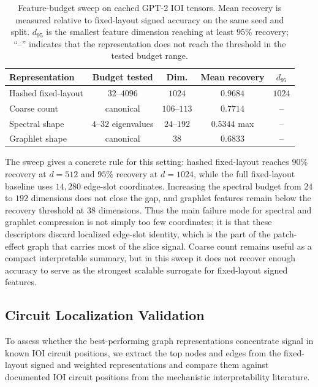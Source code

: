 \documentclass[11pt,a4paper]{article}
\begin{document}
\begin{table}[H]
\centering
\small
\begin{tabular}{lcccc}
\toprule
\textbf{Representation} & \textbf{Budget tested} & \textbf{Dim.} & \textbf{Mean recovery} & \textbf{$d_{95}$} \\
\midrule
Hashed fixed-layout & $32$--$4096$ & $1024$ & $0.9684$ & $1024$ \\
Coarse count & canonical & $106$--$113$ & $0.7714$ & -- \\
Spectral shape & $4$--$32$ eigenvalues & $24$--$192$ & $0.5344$ max & -- \\
Graphlet shape & canonical & $38$ & $0.6833$ & -- \\
\bottomrule
\end{tabular}
\caption{Feature-budget sweep on cached GPT-2 IOI tensors. Mean recovery is measured relative to fixed-layout signed accuracy on the same seed and split. $d_{95}$ is the smallest feature dimension reaching at least $95\%$ recovery; ``--'' indicates that the representation does not reach the threshold in the tested budget range.}
\label{tab:feature_budget_sweep}
\end{table}

The sweep gives a concrete rule for this setting: hashed fixed-layout reaches $90\%$ recovery at $d=512$ and $95\%$ recovery at $d=1024$, while the full fixed-layout baseline uses $14,\!280$ edge-slot coordinates. Increasing the spectral budget from $24$ to $192$ dimensions does not close the gap, and graphlet features remain below the recovery threshold at $38$ dimensions. Thus the main failure mode for spectral and graphlet compression is not simply too few coordinates; it is that these descriptors discard localized edge-slot identity, which is the part of the patch-effect graph that carries most of the slice signal. Coarse count remains useful as a compact interpretable summary, but in this sweep it does not recover enough accuracy to serve as the strongest scalable surrogate for fixed-layout signed features.

\subsection{Circuit Localization Validation}
\label{sec:circuit_localization}

To assess whether the best-performing graph representations concentrate signal in known IOI circuit positions, we extract the top nodes and edges from the fixed-layout signed and weighted representations and compare them against documented IOI circuit positions from the mechanistic interpretability literature.
\end{document}
